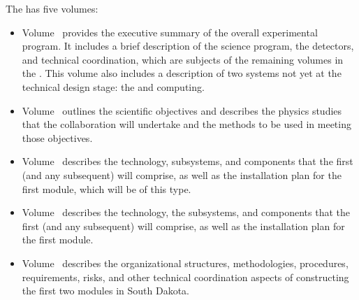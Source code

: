 The   has five volumes:

\begin{itemize}
\item Volume~\volnumberexec{} provides the executive summary of the overall experimental program. It includes a brief description of the  science program, the  detectors, and technical coordination, which are subjects of the remaining volumes in the . This volume also includes a description of two systems not yet at the technical design stage: the   and  computing.
\item Volume~\volnumberphysics{} outlines the scientific objectives and describes the physics studies that the  collaboration will undertake and the methods to be used in meeting those objectives.
\item Volume~\volnumbersp{} describes the   technology, subsystems, and components that the first (and any subsequent)   will comprise, as well as the installation plan for the first  module, which will be of this type. 
\item Volume~\volnumberdp{} describes the   technology, the subsystems, and components that  the first (and any subsequent)   will comprise, as well as the installation plan for the first  module. 
\item Volume~\volnumbertc{} describes the organizational structures,  methodologies, procedures, requirements, risks, and other technical  coordination aspects of constructing the first two  modules in South Dakota.
\end{itemize}

